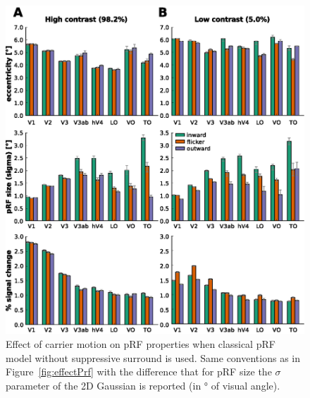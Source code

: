 \begin{figure}[htbp!]
\centering
\includegraphics[width=\textwidth]{figures/chapter_04/fig2b.eps}
\caption{Effect of carrier motion on pRF properties when classical pRF model without suppressive surround is used. Same conventions as in Figure~\ref{fig:effectPrf} with the difference that for pRF size the $\sigma$ parameter of the 2D Gaussian is reported (in ° of visual angle).}
\label{fig:effectPrf_nosupsur} 
\end{figure}

